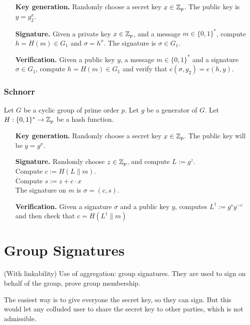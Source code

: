 \begin{itemize}[align = left, leftmargin=*]
	\item[\textbf{Key generation.}] Randomly choose a secret key $x \in {\mathbb Z}_p$. The public key is $y = g_2^x$.
	
	\item[\textbf{Signature.}] Given a private key $x \in {\mathbb Z}_p$, and a message $m \in \{0,1\}^*$, compute $h = H(m) \in G_1$ and $\sigma = h^x$. The signature is $\sigma \in G_1$.
	
	\item[\textbf{Verification.}] Given a public key $y$, a message $m \in \{0,1\}^*$ and a signature $\sigma \in G_1$, compute $h = H(m) \in G_1$ and verify that $e(\sigma,g_2) = e \left( h, y \right)$.
	
\end{itemize}

\subsubsection*{Schnorr}
\label{sec:schnorr}
\cite{Schnorr90}
Let $G$ be a cyclic group of prime order $p$. Let $g$ be a generator of $G$. Let $H : \{0,1\}^\ast \rightarrow {\mathbb Z}_p$ be a hash function.

\begin{itemize}[align = left, leftmargin=*]
	\item[\textbf{Key generation.}]	Randomly choose a secret key $x \in {\mathbb Z}_p$. The public key will be $y = g^x$.
	\item[\textbf{Signature.}] Randomly choose $z \in  {\mathbb Z}_p$, and compute $L := g^z$. \\
Compute $c := H(L \parallel m)$. \\
Compute $s := z + c \cdot x$ \\
The signature on $m$ is $\sigma = (c,s)$.
	\item[\textbf{Verification.}] Given a signature $\sigma$ and a public key $y$, computes $L^{\dagger} := g^{s} y^{-c}$ and then check that $c = H(L^{\dagger} \parallel m) $
\end{itemize}

\section{Group Signatures}
(With linkability)
Use of aggregation: group signatures. They are used to sign on behalf of the group, prove group membership.

The easiest way is to give everyone the secret key, so they can sign. But this would let any colluded user to share the secret key to other parties, which is not admissible.

